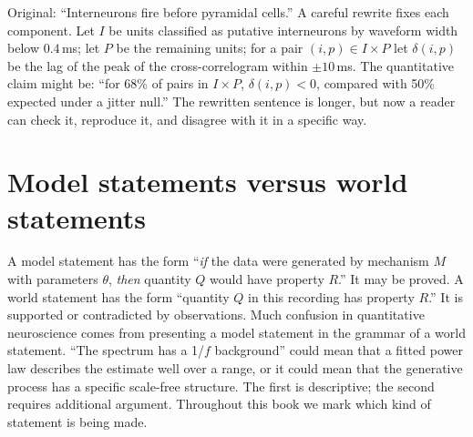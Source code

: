 \begin{workedexample}
Original: ``Interneurons fire before pyramidal cells.'' A careful rewrite fixes each component. Let $I$ be units classified as putative interneurons by waveform width below $0.4$\,ms; let $P$ be the remaining units; for a pair $(i,p)\in I\times P$ let $\delta(i,p)$ be the lag of the peak of the cross-correlogram within $\pm10$\,ms. The quantitative claim might be: ``for 68\% of pairs in $I\times P$, $\delta(i,p)<0$, compared with 50\% expected under a jitter null.'' The rewritten sentence is longer, but now a reader can check it, reproduce it, and disagree with it in a specific way.
\end{workedexample}

\section{Model statements versus world statements}
A model statement has the form ``\emph{if} the data were generated by mechanism $M$ with parameters $\theta$, \emph{then} quantity $Q$ would have property $R$.'' It may be proved. A world statement has the form ``quantity $Q$ in this recording has property $R$.'' It is supported or contradicted by observations. Much confusion in quantitative neuroscience comes from presenting a model statement in the grammar of a world statement. ``The spectrum has a 1/$f$ background'' could mean that a fitted power law describes the estimate well over a range, or it could mean that the generative process has a specific scale-free structure. The first is descriptive; the second requires additional argument. Throughout this book we mark which kind of statement is being made.
